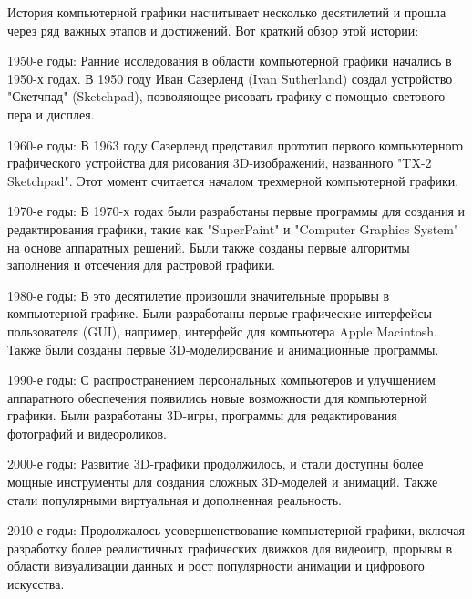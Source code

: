 \documentclass{beamer}
\begin{document}
	\begin{frame}
	

	История компьютерной графики насчитывает несколько десятилетий и прошла через ряд важных этапов и достижений. Вот краткий обзор этой истории:
	
	1950-е годы: Ранние исследования в области компьютерной графики начались в 1950-х годах. В 1950 году Иван Сазерленд (Ivan Sutherland) создал устройство "Скетчпад" (Sketchpad), позволяющее рисовать графику с помощью светового пера и дисплея.
	
	1960-е годы: В 1963 году Сазерленд представил прототип первого компьютерного графического устройства для рисования 3D-изображений, названного "TX-2 Sketchpad". Этот момент считается началом трехмерной компьютерной графики.
	
	1970-е годы: В 1970-х годах были разработаны первые программы для создания и редактирования графики, такие как "SuperPaint" и "Computer Graphics System" на основе аппаратных решений. Были также созданы первые алгоритмы заполнения и отсечения для растровой графики.
	
	1980-е годы: В это десятилетие произошли значительные прорывы в компьютерной графике. Были разработаны первые графические интерфейсы пользователя (GUI), например, интерфейс для компьютера Apple Macintosh. Также были созданы первые 3D-моделирование и анимационные программы.
	
	1990-е годы: С распространением персональных компьютеров и улучшением аппаратного обеспечения появились новые возможности для компьютерной графики. Были разработаны 3D-игры, программы для редактирования фотографий и видеороликов.
	
	2000-е годы: Развитие 3D-графики продолжилось, и стали доступны более мощные инструменты для создания сложных 3D-моделей и анимаций. Также стали популярными виртуальная и дополненная реальность.
	
	2010-е годы: Продолжалось усовершенствование компьютерной графики, включая разработку более реалистичных графических движков для видеоигр, прорывы в области визуализации данных и рост популярности анимации и цифрового искусства.
	
	\end{frame}
\fi
	
\end{document}
